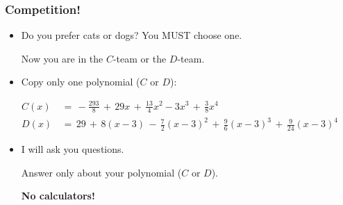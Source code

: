 \documentclass[14pt]{beamer}
\begin{document}
\begin{frame}[t]
	\frametitle{Competition!}

	\begin{itemize}
		\item Do you prefer cats or dogs? You MUST choose one.

			Now you are in the $C$-team or the $D$-team.


		\item Copy only one polynomial ($C$ or $D$):
	\end{itemize}
	{\fontsize{13}{13}\selectfont \begin{align*}C(x)&\, = \, -\frac{293}{8}\, + \, 29x \, + \, \frac{13}{4}x^{2}-3x^{3}\, + \, \frac{3}{8}x^{4}\phantom{\int}\\ D(x)&\, = \, 29 \, + \, 8(x -3) \, - \, \frac{7}{2}(x-3)^{2}\, + \, \frac{9}{6}(x-3)^{3}\, + \, \frac{9}{24}(x-3)^{4}\end{align*} }
	\begin{itemize}
		\item I will ask you questions.

			Answer only about your polynomial ($C$ or $D$).

			{\bfseries No calculators!}
	\end{itemize}
\end{frame}
\end{document}
